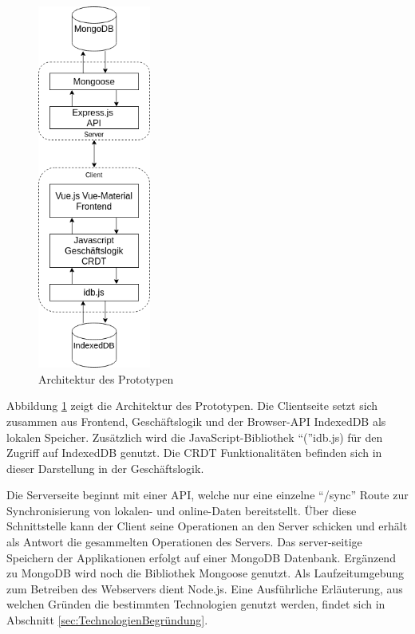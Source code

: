 \documentclass[a4paper, 12pt]{scrreprt}
\begin{document}
\begin{figure}[H]
	\centering
	\includegraphics[width=0.33\textwidth]{architektur.png}
	\caption{Architektur des Prototypen}
	\label{fig:architektur}
\end{figure}

Abbildung \ref{fig:architektur} zeigt die Architektur des Prototypen. Die Clientseite setzt sich zusammen aus Frontend, Geschäftslogik und der Browser-API IndexedDB als lokalen Speicher. Zusätzlich wird die JavaScript-Bibliothek \enquote(idb.js) für den Zugriff auf IndexedDB genutzt. Die CRDT Funktionalitäten befinden sich in dieser Darstellung in der Geschäftslogik. 

Die Serverseite beginnt mit einer API, welche nur eine einzelne \enquote{/sync} Route zur Synchronisierung von lokalen- und online-Daten bereitstellt. Über diese Schnittstelle kann der Client seine Operationen an den Server schicken und erhält als Antwort die gesammelten Operationen des Servers. Das server-seitige Speichern der Applikationen erfolgt auf einer MongoDB Datenbank. Ergänzend zu MongoDB wird noch die Bibliothek Mongoose genutzt. Als Laufzeitumgebung zum Betreiben des Webservers dient Node.js. Eine Ausführliche Erläuterung, aus welchen Gründen die bestimmten Technologien genutzt werden, findet sich in Abschnitt \ref{sec:TechnologienBegründung}.
\end{document}

